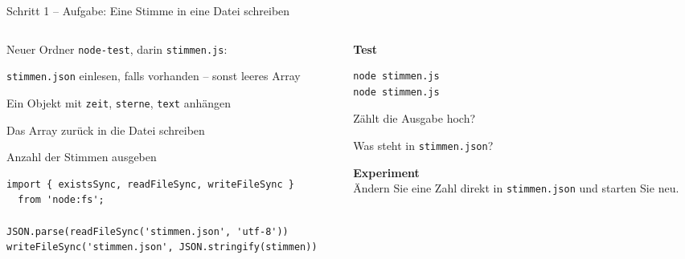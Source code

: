 \begin{frame}[fragile]{Schritt 1 -- Aufgabe: Eine Stimme in eine Datei schreiben}
  \footnotesize
  \begin{columns}[onlytextwidth,t]
    \begin{column}{0.57\textwidth}
      Neuer Ordner \texttt{node-test}, darin \texttt{stimmen.js}:
      \begin{tugenumerate}
        \item \texttt{stimmen.json} einlesen, falls vorhanden -- sonst leeres Array
        \item Ein Objekt mit \texttt{zeit}, \texttt{sterne}, \texttt{text} anhängen
        \item Das Array zurück in die Datei schreiben
        \item Anzahl der Stimmen ausgeben
      \end{tugenumerate}
\begin{lstlisting}[style=jssm,numbers=none]
import { existsSync, readFileSync, writeFileSync }
  from 'node:fs';

JSON.parse(readFileSync('stimmen.json', 'utf-8'))
writeFileSync('stimmen.json', JSON.stringify(stimmen))
\end{lstlisting}
    \end{column}
    \begin{column}{0.39\textwidth}
      \textbf{Test}
\begin{lstlisting}[style=term]
node stimmen.js
node stimmen.js
\end{lstlisting}
      \begin{tugitemize}
        \item Zählt die Ausgabe hoch?
        \item Was steht in \texttt{stimmen.json}?
      \end{tugitemize}
      \vspace{0.4em}
      \textbf{Experiment}\\
      Ändern Sie eine Zahl direkt in \texttt{stimmen.json}
      und starten Sie neu.
    \end{column}
  \end{columns}
\end{frame}

